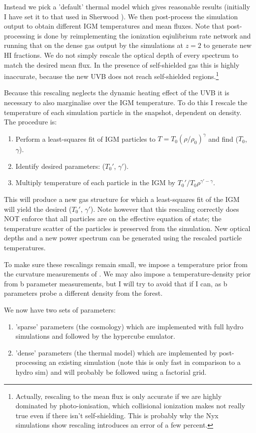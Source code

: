 \documentclass[10pt, aps, prd]{revtex4-1}
\begin{document}
Instead we pick a 'default' thermal model which gives reasonable results (initially 
I have set it to that used in Sherwood \cite{Bolton:2016}). We then post-process 
the simulation output to obtain different IGM temperatures and mean fluxes.
Note that post-processing is done by reimplementing the ionization eqiulibrium rate network 
and running that on the dense gas output by the simulations at $z=2$ to generate new HI fractions.
We do not simply rescale the optical depth of every spectrum to match the desired mean flux. 
In the presence of self-shielded gas this is highly inaccurate, because the new UVB does not reach self-shielded 
regions.\footnote{Actually, rescaling to the mean flux is only accurate if we are highly dominated by photo-ionisation, 
which collisional ionization makes not really true even if there isn't self-shielding.
This is probably why the Nyx simulations show rescaling introduces an error of a few percent.}

Because this rescaling neglects the dynamic heating effect of the UVB it is necessary to also marginalise
over the IGM temperature. To do this I rescale the temperature of each simulation particle in the snapshot, 
dependent on density. The procedure is:
\begin{enumerate}
\item Perform a least-squares fit of IGM particles to $T = T_0 (\rho/\rho_0)^\gamma$ and find ($T_0$, $\gamma$).
\item Identify desired parameters: ($T_0'$, $\gamma'$).
\item Multiply temperature of each particle in the IGM by $T_0'/T_0 \rho^{\gamma'-\gamma}$.
\end{enumerate}
This will produce a new gas structure for which a least-squares fit of the IGM will yield the desired ($T_0'$, $\gamma'$).
Note however that this rescaling correctly does NOT enforce that all particles are on the effective equation of state; the 
temperature scatter of the particles is preserved from the simulation. New optical depths and a new power spectrum can be generated using the rescaled particle temperatures. 

To make sure these rescalings remain small, we impose a temperature prior from the curvature measurements 
of \cite{Becker:2011}. We may also impose a temperature-density prior from b parameter measurements, but I will try to avoid 
that if I can, as b parameters probe a different density from the forest.

We now have two sets of parameters:
\begin{enumerate}
\item 'sparse' parameters (the cosmology) which are implemented with full hydro simulations and 
followed by the hypercube emulator.  
\item 'dense' parameters (the thermal model) which are implemented by post-processing an existing 
simulation (note this is only fast in comparison to a hydro sim) and will probably be followed
using a factorial grid.
\end{enumerate}
\end{document}
